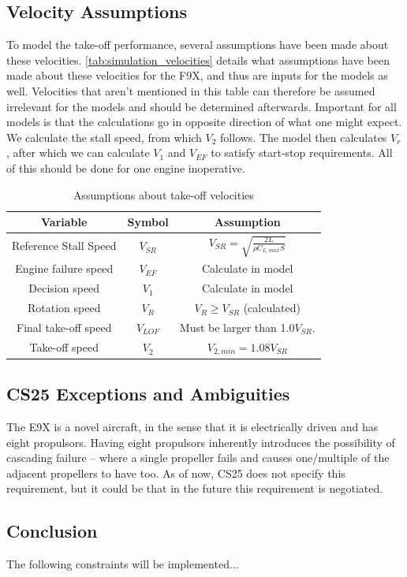 \subsection{Velocity Assumptions}
To model the take-off performance, several assumptions have been made about these velocities. \autoref{tab:simulation_velocities} details what assumptions have been made about these velocities for the F9X, and thus are inputs for the models as well. Velocities that aren't mentioned in this table can therefore be assumed irrelevant for the models and should be determined afterwards. Important for all models is that the calculations go in opposite direction of what one might expect. We calculate the stall speed, from which $V_2$ follows. The model then calculates $V_r$, after which we can calculate $V_1$ and $V_{EF}$ to satisfy start-stop requirements. All of this should be done for one engine inoperative.

\begin{table}[!ht]
    \centering
    \begin{tabular}{ccc} \hline \hline
        \textbf{Variable}           & \textbf{Symbol} & \textbf{Assumption}                                             \\ \hline
         Reference Stall Speed      & $V_{SR}$        & $V_{SR} = \sqrt{\frac{2L}{\rho C_{L,max}S}}$                   \\
         Engine failure speed       & $V_{EF}$        & Calculate in model                                           \\
         Decision speed             & $V_{1}$         & Calculate in model                                           \\
         Rotation speed             & $V_{R}$         & $V_{R} \geq V_{SR}$ (calculated)                                 \\
         Final take-off speed       & $V_{LOF}$       & Must be larger than 1.0$V_{SR}$.                               \\
         Take-off speed             & $V_{2}$         & $V_{2,min}=1.08 V_{SR}$                                           \\ \hline
    \end{tabular}
    \caption{Assumptions about take-off velocities}
    \label{tab:simulation_velocities}
\end{table}

\subsection{CS25 Exceptions and Ambiguities}
The E9X is a novel aircraft, in the sense that it is electrically driven and has eight propulsors. Having eight propulsors inherently introduces the possibility of cascading failure -- where a single propeller fails and causes one/multiple of the adjacent propellers to have too. As of now, CS25 does not specify this requirement, but it could be that in the future this requirement is negotiated.

\subsection{Conclusion}
The following constraints will be implemented...